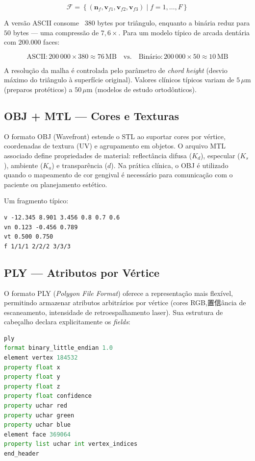 \begin{equation}
\label{eq:stl-face}
\mathcal{F} = \left\{ (\mathbf{n}_f, \mathbf{v}_{f1}, \mathbf{v}_{f2}, \mathbf{v}_{f3}) \mid f = 1,\dots,F \right\}
\end{equation}

A versão ASCII consome ~$380$ bytes por triângulo, enquanto a binária reduz para $50$ bytes — uma compressão de $7,6\times$. Para um modelo típico de arcada dentária com $200.000$ faces:

\[
\text{ASCII}: 200\,000 \times 380 \approx 76\,\text{MB} \quad\text{vs.}\quad \text{Binário}: 200\,000 \times 50 \approx 10\,\text{MB}
\]

A resolução da malha é controlada pelo parâmetro de \textit{chord height} (desvio máximo do triângulo à superfície original). Valores clínicos típicos variam de $5\,\mu\text{m}$ (preparos protéticos) a $50\,\mu\text{m}$ (modelos de estudo ortodônticos).

\subsection{OBJ + MTL — Cores e Texturas}
\label{subsec:obj-mtl}

O formato OBJ (Wavefront) estende o STL ao suportar cores por vértice, coordenadas de textura (UV) e agrupamento em objetos. O arquivo MTL associado define propriedades de material: reflectância difusa ($K_d$), especular ($K_s$), ambiente ($K_a$) e transparência ($d$). Na prática clínica, o OBJ é utilizado quando o mapeamento de cor gengival é necessário para comunicação com o paciente ou planejamento estético.

Um fragmento típico:
\begin{verbatim}
v -12.345 8.901 3.456 0.8 0.7 0.6
vn 0.123 -0.456 0.789
vt 0.500 0.750
f 1/1/1 2/2/2 3/3/3
\end{verbatim}

\subsection{PLY — Atributos por Vértice}
\label{subsec:ply}

O formato PLY (\textit{Polygon File Format}) oferece a representação mais flexível, permitindo armazenar atributos arbitrários por vértice (cores RGB,置信ância de escaneamento, intensidade de retroespalhamento laser). Sua estrutura de cabeçalho declara explicitamente os \textit{fields}:

\begin{lstlisting}[language=Python, caption=Estrutura de cabeçalho PLY para malha com confiança]
ply
format binary_little_endian 1.0
element vertex 184532
property float x
property float y
property float z
property float confidence
property uchar red
property uchar green
property uchar blue
element face 369064
property list uchar int vertex_indices
end_header
\end{lstlisting}

